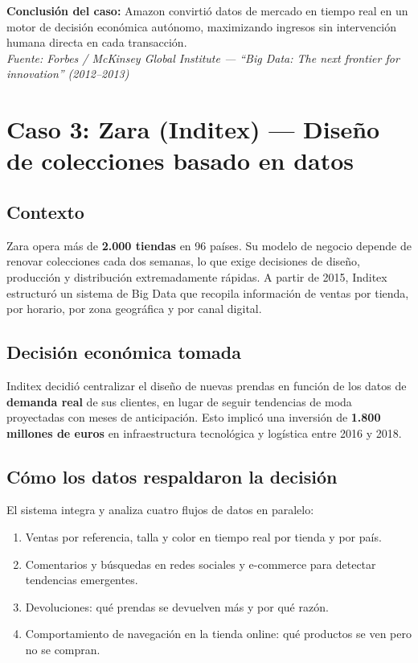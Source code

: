 \documentclass[12pt, a4paper]{article}
\begin{document}
\begin{conclusionbox}
\textbf{Conclusión del caso:} Amazon convirtió datos de mercado en tiempo real en un motor de decisión económica autónomo, maximizando ingresos sin intervención humana directa en cada transacción.\\[4pt]
\textit{\small Fuente: Forbes / McKinsey Global Institute --- ``Big Data: The next frontier for innovation'' (2012--2013)}
\end{conclusionbox}


\section{Caso 3: Zara (Inditex) --- Diseño de colecciones basado en datos}

\subsection{Contexto}

Zara opera más de \textbf{2.000 tiendas} en 96 países. Su modelo de negocio depende de renovar colecciones cada dos semanas, lo que exige decisiones de diseño, producción y distribución extremadamente rápidas. A partir de 2015, Inditex estructuró un sistema de Big Data que recopila información de ventas por tienda, por horario, por zona geográfica y por canal digital.

\subsection{Decisión económica tomada}

Inditex decidió centralizar el diseño de nuevas prendas en función de los datos de \textbf{demanda real} de sus clientes, en lugar de seguir tendencias de moda proyectadas con meses de anticipación. Esto implicó una inversión de \textbf{1.800 millones de euros} en infraestructura tecnológica y logística entre 2016 y 2018.

\subsection{Cómo los datos respaldaron la decisión}

El sistema integra y analiza cuatro flujos de datos en paralelo:

\begin{enumerate}[label=(\alph*), leftmargin=2cm]
  \item Ventas por referencia, talla y color en tiempo real por tienda y por país.
  \item Comentarios y búsquedas en redes sociales y e-commerce para detectar tendencias emergentes.
  \item Devoluciones: qué prendas se devuelven más y por qué razón.
  \item Comportamiento de navegación en la tienda online: qué productos se ven pero no se compran.
\end{enumerate}
\end{document}
